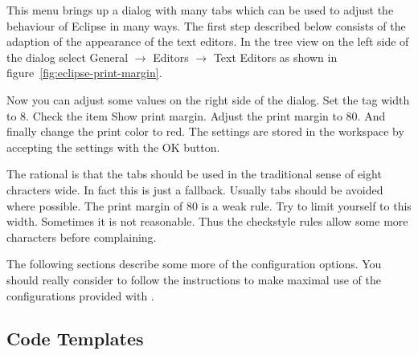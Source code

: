 \documentclass{extex-doc}
\newcommand\menu{\textsf}
\newcommand\sub{\(\rightarrow\) }
\begin{document}
This menu brings up a dialog with many tabs which can be used to
adjust the behaviour of Eclipse in many ways. The first step described
below consists of the adaption of the appearance of the text editors.
In the tree view on the left side of the dialog select \menu{General
  \sub Editors \sub Text Editors} as shown in
figure~\ref{fig:eclipse-print-margin}. 

Now you can adjust some values on the right side of the dialog. Set
the tag width to 8. Check the item \menu{Show print margin}. Adjust
the print margin to 80. And finally change the print color to red. The
settings are stored in the workspace by accepting the settings with
the \menu{OK} button.

The rational is that the tabs should be used in the traditional sense
of eight chracters wide. In fact this is just a fallback. Usually tabs
should be avoided where possible. The print margin of 80 is a weak
rule. Try to limit yourself to this width. Sometimes it is not
reasonable. Thus the checkstyle rules allow some more characters
before complaining.

The following sections describe some more of the configuration
options. You should really consider to follow the instructions to make
maximal use of the configurations provided with \ExTeX.



\subsection{Code Templates}
\end{document}
